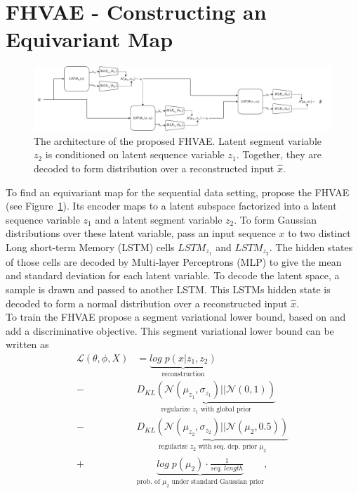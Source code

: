 \documentclass{article} %
\begin{document}
\section*{FHVAE - Constructing an Equivariant Map}
\begin{figure}
	\label{fig:fhave}
	\centering
	\includegraphics[width=1\linewidth]{../figures/fhvae_complete.pdf}
	\caption{The architecture of the proposed FHVAE. Latent segment variable $z_2$ is conditioned on latent sequence variable $z_1$. Together, they are decoded to form distribution over a reconstructed input $\hat{x}$.}
\end{figure} 
To find an equivariant map for the sequential data setting, \citet{hsu2017unsupervised} propose the FHVAE (see Figure~\ref{fig:fhave}). Its encoder maps to a latent subspace factorized into a latent sequence variable $z_1$ and a latent segment variable $z_2$. To form Gaussian distributions over these latent variable, \citet{hsu2017unsupervised} pass an input sequence $x$ to two distinct Long short-term Memory (LSTM) \cite{hochreiter1997long} cells $LSTM_{z_1}$ and $LSTM_{z_2}$. The hidden states of those cells are decoded by Multi-layer Perceptrons (MLP) to give the mean and standard deviation for each latent variable. To decode the latent space, a sample is drawn and passed to another LSTM. This LSTMs hidden state is decoded to form a normal distribution over a reconstructed input $\hat{x}$.\\
To train the FHVAE \citet{hsu2017unsupervised} propose a segment variational lower bound, based on \citet{kingma2013auto} and add a discriminative objective. This segment variational lower bound can be written as
\begin{align*}
\mathcal{L}(\theta, \phi, X)& = %
\underbrace{log\;p(x|z_1, z_2)}_{\text{reconstruction}}\\%
-&\underbrace{D_{KL}(\mathcal{N}(\mu_{z_1}, \sigma_{z_1})||\mathcal{N}(0,1))}_{\text{regularize $z_1$ with global prior}}\\
-&\underbrace{D_{KL}(\mathcal{N}(\mu_{z_2}, \sigma_{z_2})||\mathcal{N}(\mu_2,0.5))}_{\text{regularize $z_2$ with seq. dep. prior $\mu_2$}}\\
+&\underbrace{log\;p(\mu_2) \cdot \frac{1}{seq.\;length}}_{\text{prob. of $\mu_2$ under standard Gaussian prior}}, 
\end{align*}
\end{document}
